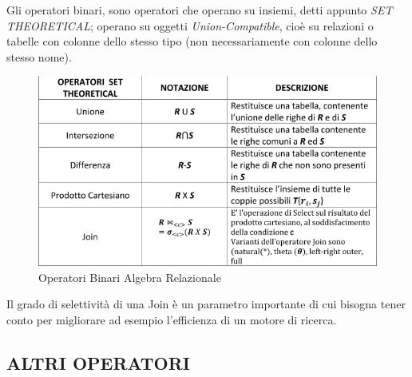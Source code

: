Gli operatori binari, sono operatori che operano su insiemi, detti appunto \textit{SET THEORETICAL}; operano su oggetti \textit{Union-Compatible}, cioè su relazioni o tabelle con colonne dello stesso tipo (non necessariamente con colonne dello stesso nome).

\begin{center}
\begin{figure}[H]
\centering
\includegraphics[scale=0.8]{figures/relalg2.png}
\caption{Operatori Binari Algebra Relazionale} 
\end{figure}
\end{center}

Il grado di selettività di una Join è un parametro importante di cui bisogna tener conto per migliorare ad esempio l’efficienza di un motore di ricerca. 

\subsection{ALTRI OPERATORI}

